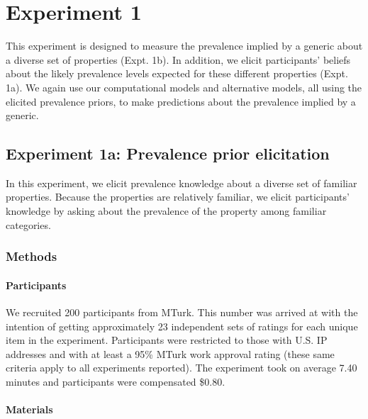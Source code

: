 \documentclass[floatsintext,doc]{apa6}
\let\oldparagraph\paragraph
\renewcommand{\paragraph}[1]{\oldparagraph{#1}\mbox{}}
\begin{document}
\hypertarget{experiment-1}{%
\section{Experiment 1}\label{experiment-1}}

This experiment is designed to measure the prevalence implied by a generic about a diverse set of properties (Expt. 1b).
In addition, we elicit participants' beliefs about the likely prevalence levels expected for these different properties (Expt. 1a).
We again use our computational models and alternative models, all using the elicited prevalence priors, to make predictions about the prevalence implied by a generic.

\hypertarget{experiment-1a-prevalence-prior-elicitation}{%
\subsection{Experiment 1a: Prevalence prior elicitation}\label{experiment-1a-prevalence-prior-elicitation}}

In this experiment, we elicit prevalence knowledge about a diverse set of familiar properties.
Because the properties are relatively familiar, we elicit participants' knowledge by asking about the prevalence of the property among familiar categories.

\hypertarget{methods}{%
\subsubsection{Methods}\label{methods}}

\hypertarget{participants-1}{%
\paragraph{Participants}\label{participants-1}}

We recruited 200 participants from MTurk.
This number was arrived at with the intention of getting approximately 23 independent sets of ratings for each unique item in the experiment.
Participants were restricted to those with U.S. IP addresses and with at least a 95\% MTurk work approval rating (these same criteria apply to all experiments reported).
The experiment took on average 7.40 minutes and participants were compensated \$0.80.

\hypertarget{materials}{%
\paragraph{Materials}\label{materials}}
\end{document}

